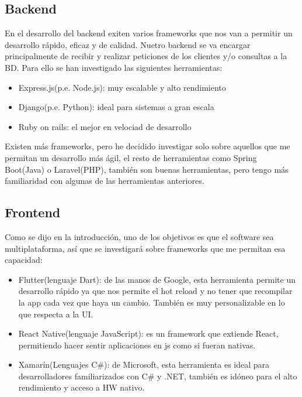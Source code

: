 
\subsection{Backend}

En el desarrollo del backend exiten varios frameworks que nos van a permitir un desarrollo rápido, eficaz y de calidad. Nuetro backend se va encargar principalmente de recibir y realizar peticiones de los clientes y/o consultas a la BD. Para ello se han investigado las siguientes herramientas:

\begin{itemize}
	\item Express.js(p.e. Node.js): muy escalable y alto rendimiento
	\item Django(p.e. Python): ideal para sistemas a gran escala
	\item Ruby on rails: el mejor en velociad de desarrollo
\end{itemize}

Existen más frameworks, pero he decidido investigar solo sobre aquellos que me permitan un desarrollo más ágil, el resto de herramientas como Spring Boot(Java) o Laravel(PHP), también son buenas herramientas, pero tengo más familiaridad con algunas de las herramientas anteriores.


\subsection{Frontend}

Como se dijo en la introducción, uno de los objetivos es que el software sea multiplataforma, así que se investigará sobre frameworks que me permitan esa capacidad:

\begin{itemize}
	\item Flutter(lenguaje Dart): de las manos de Google, esta herramienta permite un desarrollo rápido ya que nos permite el hot reload y no tener que recompilar la app cada vez que haya un cambio. También es muy personalizable en lo que respecta a la UI.
	\item React Native(lenguaje JavaScript): es un framework que extiende React, permitiendo hacer sentir aplicaciones en js como si fueran nativas.
	\item Xamarín(Lenguajes C\#): de Microsoft, esta herramienta es ideal para desarrolladores familiarizados con C\# y .NET, también es idóneo para el alto rendimiento y acceso a HW nativo.
\end{itemize}

